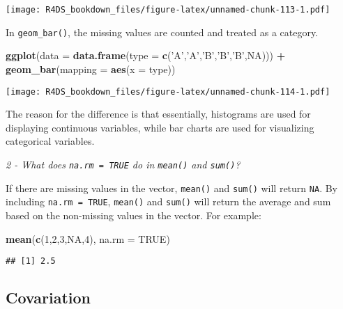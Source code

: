 \documentclass[]{article}
\newenvironment{Shaded}{\begin{snugshade}}{\end{snugshade}}
\newcommand{\KeywordTok}[1]{\textcolor[rgb]{0.13,0.29,0.53}{\textbf{#1}}}
\newcommand{\DataTypeTok}[1]{\textcolor[rgb]{0.13,0.29,0.53}{#1}}
\newcommand{\DecValTok}[1]{\textcolor[rgb]{0.00,0.00,0.81}{#1}}
\newcommand{\StringTok}[1]{\textcolor[rgb]{0.31,0.60,0.02}{#1}}
\newcommand{\OtherTok}[1]{\textcolor[rgb]{0.56,0.35,0.01}{#1}}
\newcommand{\OperatorTok}[1]{\textcolor[rgb]{0.81,0.36,0.00}{\textbf{#1}}}
\newcommand{\NormalTok}[1]{#1}
\theoremstyle{definition}
\theoremstyle{definition}
\theoremstyle{definition}
\theoremstyle{remark}
\begin{document}
\texttt{[image: R4DS\_bookdown\_files/figure-latex/unnamed-chunk-113-1.pdf]}

In \texttt{geom\_bar()}, the missing values are counted and treated as a
category.

\begin{Shaded}
\begin{Highlighting}[]
\KeywordTok{ggplot}\NormalTok{(}\DataTypeTok{data =} \KeywordTok{data.frame}\NormalTok{(}\DataTypeTok{type =} \KeywordTok{c}\NormalTok{(}\StringTok{'A'}\NormalTok{,}\StringTok{'A'}\NormalTok{,}\StringTok{'B'}\NormalTok{,}\StringTok{'B'}\NormalTok{,}\StringTok{'B'}\NormalTok{,}\OtherTok{NA}\NormalTok{))) }\OperatorTok{+}\StringTok{ }
\StringTok{  }\KeywordTok{geom_bar}\NormalTok{(}\DataTypeTok{mapping =} \KeywordTok{aes}\NormalTok{(}\DataTypeTok{x =}\NormalTok{ type))}
\end{Highlighting}
\end{Shaded}

\texttt{[image: R4DS\_bookdown\_files/figure-latex/unnamed-chunk-114-1.pdf]}

The reason for the difference is that essentially, histograms are used
for displaying continuous variables, while bar charts are used for
visualizing categorical variables.

\emph{2 - What does \texttt{na.rm\ =\ TRUE} do in \texttt{mean()} and
\texttt{sum()}?}

If there are missing values in the vector, \texttt{mean()} and
\texttt{sum()} will return \texttt{NA}. By including
\texttt{na.rm\ =\ TRUE}, \texttt{mean()} and \texttt{sum()} will return
the average and sum based on the non-missing values in the vector. For
example:

\begin{Shaded}
\begin{Highlighting}[]
\KeywordTok{mean}\NormalTok{(}\KeywordTok{c}\NormalTok{(}\DecValTok{1}\NormalTok{,}\DecValTok{2}\NormalTok{,}\DecValTok{3}\NormalTok{,}\OtherTok{NA}\NormalTok{,}\DecValTok{4}\NormalTok{), }\DataTypeTok{na.rm =} \OtherTok{TRUE}\NormalTok{)}
\end{Highlighting}
\end{Shaded}

\begin{verbatim}
## [1] 2.5
\end{verbatim}

\subsection{Covariation}\label{covariation}
\end{document}
